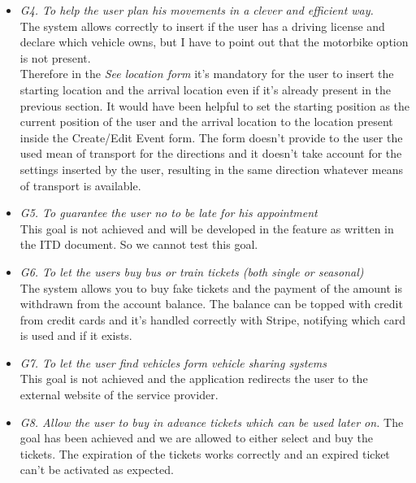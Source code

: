 \begin{itemize}
\item \textit{G4. To help the user plan his movements in a clever and efficient way.}\\
The system allows correctly to insert if the user has a driving license and declare which vehicle owns, but I have to point out that the motorbike option is not present. \\
Therefore in the \textit{See location form} it's mandatory for the user to insert the starting location and the arrival location even if it's already present in the previous section. It would have been helpful to set the starting position as the current position of the user and the arrival location to the location present inside the Create/Edit Event form. The form doesn't provide to the user the used mean of transport for the directions and it doesn't take account for the settings inserted by the user, resulting in the same direction whatever means of transport is available.

\item \textit{G5. To guarantee the user no to be late for his appointment}\\
This goal is not achieved and will be developed in the feature as written in the ITD document. So we cannot test this goal.

\item \textit{G6. To let the users buy bus or train tickets (both single or seasonal) }\\
The system allows you to buy fake tickets and the payment of the amount is withdrawn from the account balance.
The balance can be topped with credit from credit cards and it's handled correctly with Stripe, notifying which card is used and if it exists.

\item \textit{G7. To let the user find vehicles form vehicle sharing systems}\\
This goal is not achieved and the application redirects the user to the external website of the service provider.

\item \textit{G8. Allow the user to buy in advance tickets which can be used later on.}
The goal has been achieved and we are allowed to either select and buy the tickets. The expiration of the tickets works correctly and an expired ticket can't be activated as expected.


\end{itemize}